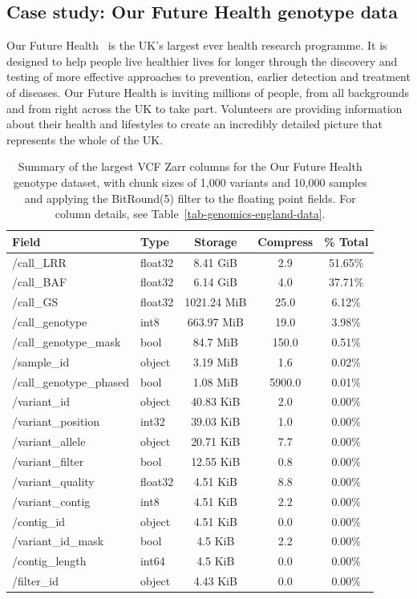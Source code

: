\documentclass[a4paper,num-refs]{oup-contemporary}
\begin{document}
\subsection{Case study: Our Future Health genotype data}
Our Future Health~\cite{ofhmain_2025}  is the UK’s largest ever health research programme. 
It is designed to help people live healthier lives for longer through the 
discovery and testing of more effective approaches to prevention, earlier 
detection and treatment of diseases.
Our Future Health is inviting millions of people, from all backgrounds and 
from right across the UK to take part. Volunteers are providing information 
about their health and lifestyles to create an incredibly detailed picture 
that represents the whole of the UK. 

\begin{table}
\caption{Summary of the largest VCF Zarr columns for the Our Future Health
    genotype dataset, with chunk sizes of 1,000 variants and 
    10,000 samples and applying the BitRound(5) filter to the floating point 
    fields.
    For column details, see Table~\ref{tab-genomics-england-data}.
    \label{tab-ofh-data}}
\begin{tabular}{llS[table-format=3.2]S[table-format=4.1]S[table-format=3.2]}
\toprule
{Field} & {Type} & {Storage} & {Compress} & {\% Total} \\
\midrule
/call\_LRR & float32 & 8.41 GiB & 2.9 & 51.65\% \\
/call\_BAF & float32 & 6.14 GiB & 4.0 & 37.71\% \\
/call\_GS & float32 & 1021.24 MiB & 25.0 & 6.12\% \\
/call\_genotype & int8 & 663.97 MiB & 19.0 & 3.98\% \\
/call\_genotype\_mask & bool & 84.7 MiB & 150.0 & 0.51\% \\
/sample\_id & object & 3.19 MiB & 1.6 & 0.02\% \\
/call\_genotype\_phased & bool & 1.08 MiB & 5900.0 & 0.01\% \\
/variant\_id & object & 40.83 KiB & 2.0 & 0.00\% \\
/variant\_position & int32 & 39.03 KiB & 1.0 & 0.00\% \\
/variant\_allele & object & 20.71 KiB & 7.7 & 0.00\% \\
/variant\_filter & bool & 12.55 KiB & 0.8 & 0.00\% \\
/variant\_quality & float32 & 4.51 KiB & 8.8 & 0.00\% \\
/variant\_contig & int8 & 4.51 KiB & 2.2 & 0.00\% \\
/contig\_id & object & 4.51 KiB & 0.0 & 0.00\% \\
/variant\_id\_mask & bool & 4.5 KiB & 2.2 & 0.00\% \\
/contig\_length & int64 & 4.5 KiB & 0.0 & 0.00\% \\
/filter\_id & object & 4.43 KiB & 0.0 & 0.00\% \\
\bottomrule
\end{tabular}
\end{table}
\end{document}
